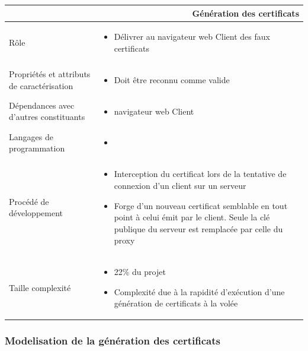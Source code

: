 \documentclass[a4paper,11pt,french]{article}
\begin{document}
\begin{center}
        \vspace*{0.7cm}
        \begin{tabularx}{16cm}{|l|X|}
        \hline
        \multicolumn{2}{|r|}{\textbf{Génération des certificats}}\\
        \hline
        R\^ole &  \begin{itemize}\item Délivrer au navigateur web Client des faux certificats\end{itemize}\\
        \hline
        Propriétés et attributs de caractérisation & \begin{itemize} \item Doit être reconnu comme valide \end{itemize}\\
        \hline
        Dépendances avec d'autres constituants & \begin{itemize}\item navigateur web Client\end{itemize}\\
        \hline
        Langages de programmation & \begin{itemize} \item  \end{itemize}\\
        \hline
        Procédé de développement & \begin{itemize}\item Interception du certificat lors de la tentative de connexion d'un client sur un serveur \item Forge d'un nouveau certificat semblable en tout point à celui émit par le client. Seule la clé publique du serveur est remplacée par celle du proxy
\end{itemize}\\
        \hline
        Taille complexité & \begin{itemize}\item 22\% du projet \item Complexité due à la rapidité d'exécution d'une génération de certificats à la volée\end{itemize}\\
        \hline
        \end{tabularx}
\end{center}



\subsubsection{Modelisation de la génération des certificats}
\end{document}
